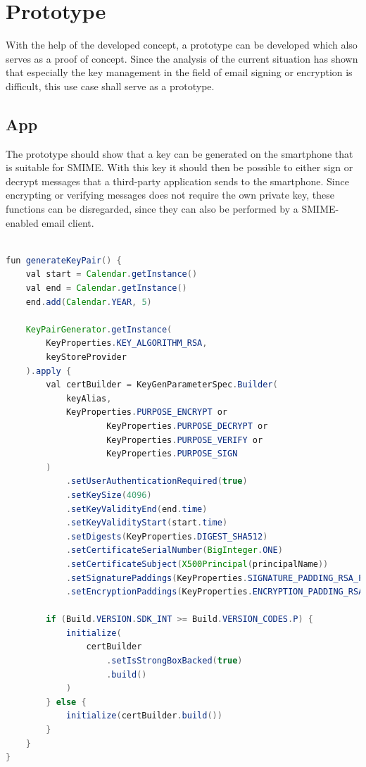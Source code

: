 \documentclass[12pt,oneside,a4paper,parskip]{scrbook}
\begin{document}
\section{Prototype}
With the help of the developed concept, a prototype can be developed which also serves as a proof of concept. Since the analysis of the current situation has shown that especially the key management in the field of email signing or encryption is difficult, this use case shall serve as a prototype. 

\subsection{App}
The prototype should show that a key can be generated on the smartphone that is suitable for SMIME. With this key it should then be possible to either sign or decrypt messages that a third-party application sends to the smartphone. Since encrypting or verifying messages does not require the own private key, these functions can be disregarded, since they can also be performed by a SMIME-enabled email client. 

\begin{lstlisting}[label=lst:keyparams,
				   language=java,
				   firstnumber=1,
				   caption=Creating an RSA key pair]

fun generateKeyPair() {
    val start = Calendar.getInstance()
    val end = Calendar.getInstance()
    end.add(Calendar.YEAR, 5)
    
    KeyPairGenerator.getInstance(
        KeyProperties.KEY_ALGORITHM_RSA,
        keyStoreProvider
    ).apply {
        val certBuilder = KeyGenParameterSpec.Builder(
            keyAlias,
            KeyProperties.PURPOSE_ENCRYPT or
                    KeyProperties.PURPOSE_DECRYPT or
                    KeyProperties.PURPOSE_VERIFY or
                    KeyProperties.PURPOSE_SIGN
        )
            .setUserAuthenticationRequired(true)
            .setKeySize(4096)
            .setKeyValidityEnd(end.time)
            .setKeyValidityStart(start.time)
            .setDigests(KeyProperties.DIGEST_SHA512)
            .setCertificateSerialNumber(BigInteger.ONE)
            .setCertificateSubject(X500Principal(principalName))
            .setSignaturePaddings(KeyProperties.SIGNATURE_PADDING_RSA_PKCS1)
            .setEncryptionPaddings(KeyProperties.ENCRYPTION_PADDING_RSA_PKCS1)

        if (Build.VERSION.SDK_INT >= Build.VERSION_CODES.P) {
            initialize(
                certBuilder
                    .setIsStrongBoxBacked(true)
                    .build()
            )
        } else {
            initialize(certBuilder.build())
        }
    }
}

\end{lstlisting}
\end{document}

